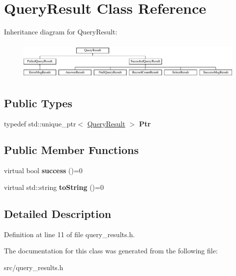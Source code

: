 \hypertarget{class_query_result}{}\section{Query\+Result Class Reference}
\label{class_query_result}
Inheritance diagram for Query\+Result\+:\begin{figure}[H]
\begin{center}
\leavevmode
\includegraphics[height=1.904762cm]{class_query_result}
\end{center}
\end{figure}
\subsection*{Public Types}
\begin{DoxyCompactItemize}
\item 
\mbox{\label{class_query_result_ad0886002733ecc0922dea3e43d4f7610}} 
typedef std\+::unique\+\_\+ptr$<$ \hyperlink{class_query_result}{Query\+Result} $>$ {\bfseries Ptr}
\end{DoxyCompactItemize}
\subsection*{Public Member Functions}
\begin{DoxyCompactItemize}
\item 
\mbox{\label{class_query_result_a86854387690b31012408c0ed27451db6}} 
virtual bool {\bfseries success} ()=0
\item 
\mbox{\label{class_query_result_a98bbf11625700569bd4c1b078f10ceea}} 
virtual std\+::string {\bfseries to\+String} ()=0
\end{DoxyCompactItemize}


\subsection{Detailed Description}


Definition at line 11 of file query\+\_\+results.\+h.



The documentation for this class was generated from the following file\+:\begin{DoxyCompactItemize}
\item 
src/query\+\_\+results.\+h\end{DoxyCompactItemize}
